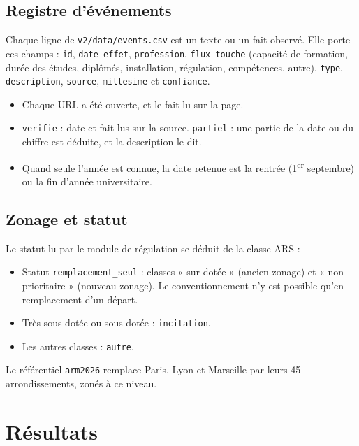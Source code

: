 \subsection{Registre d'événements}
Chaque ligne de \texttt{v2/data/events.csv} est un texte ou un fait observé. Elle porte ces champs :
\texttt{id}, \texttt{date\_effet}, \texttt{profession}, \texttt{flux\_touche} (capacité de formation, durée des
études, diplômés, installation, régulation, compétences, autre), \texttt{type}, \texttt{description},
\texttt{source}, \texttt{millesime} et \texttt{confiance}.
\begin{itemize}
  \item Chaque URL a été ouverte, et le fait lu sur la page.
  \item \texttt{verifie} : date et fait lus sur la source. \texttt{partiel} : une partie de la date ou du chiffre
  est déduite, et la description le dit.
  \item Quand seule l'année est connue, la date retenue est la rentrée (1\textsuperscript{er} septembre) ou la fin
  d'année universitaire.
\end{itemize}

\subsection{Zonage et statut}
Le statut lu par le module de régulation se déduit de la classe ARS :
\begin{itemize}
  \item Statut \texttt{remplacement\_seul} : classes « sur-dotée » (ancien zonage) et « non prioritaire »
  (nouveau zonage). Le conventionnement n'y est possible qu'en remplacement d'un départ.
  \item Très sous-dotée ou sous-dotée : \texttt{incitation}.
  \item Les autres classes : \texttt{autre}.
\end{itemize}
Le référentiel \texttt{arm2026} remplace Paris, Lyon et Marseille par leurs 45 arrondissements, zonés à ce niveau.

\section{Résultats}
